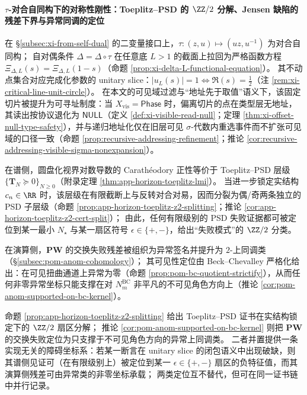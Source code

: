 \paragraph{\texorpdfstring{$\tau$}{tau}-对合自同构下的对称性刚性：Toeplitz--PSD 的 \texorpdfstring{$\ZZ/2$}{Z/2} 分解、Jensen 缺陷的残差下界与异常同调的定位}
在 \S\ref{subsec:xi-from-self-dual} 的二变量接口上，\(\tau:(z,u)\mapsto(uz,u^{-1})\) 为对合自同构；
自对偶条件 \(\Delta=\Delta\circ\tau\) 在任意底 \(L>1\) 的截面上拉回为严格函数方程 \(\Xi_{\Delta,L}(s)=\Xi_{\Delta,L}(1-s)\)（命题 \ref{prop:xi-delta-L-functional-equation}）。
其不动点集合对应完成化参数的 unitary slice：\(|u_L(s)|=1\iff \Re(s)=\tfrac12\)（注 \ref{rem:xi-critical-line-unit-circle}）。
在本文的可见域过滤与“地址先于取值”语义下，该固定切片被提升为可寻址制度：当 \(X_{\mathrm{vis}}=\mathsf{Phase}\) 时，偏离切片的点在类型层无地址，其读出按协议退化为 \(\mathsf{NULL}\)（定义 \ref{def:xi-visible-read-null}；定理 \ref{thm:xi-offset-null-type-safety}），并与递归地址化仅在旧层可见 \(\sigma\)-代数内重选事件而不扩张可见域的口径一致（命题 \ref{prop:recursive-addressing-refinement}；推论 \ref{cor:recursive-addressing-visible-sigma-nonexpansion}）。
\par
在谱侧，圆盘化视界对数导数的 Carath\'eodory 正性等价于 Toeplitz--PSD 层级 \(\{\mathbf{T}_N\succeq 0\}_{N\ge 0}\)（附录定理 \ref{thm:app-horizon-toeplitz-lmi}）。
当进一步锁定实结构 \(c_n\in\RR\) 时，该层级在有限截断上与反转对合对易，因而分裂为偶/奇两条独立的 PSD 子层级（命题 \ref{prop:app-horizon-toeplitz-z2-splitting}；推论 \ref{cor:app-horizon-toeplitz-z2-cert-split}）；
由此，任何有限级别的 PSD 失败证据都可被定位到某一最小 \(N_\star\) 与某一扇区符号 \(\epsilon\in\{+,-\}\)，给出“失败模式”的 \(\ZZ/2\) 分类。
\par
在演算侧，\(\mathbf{PW}\) 的交换失败残差被组织为异常签名并提升为 \(2\)-上同调类（\S\ref{subsec:pom-anom-cohomology}）；
其可见性定位由 Beck--Chevalley 严格化给出：在可见扭曲通道上异常为零（命题 \ref{prop:pom-bc-quotient-strictify}），从而任何非零异常坐标只能支撑在对 \(N^{\mathrm{BC}}_m\) 非平凡的不可见角色方向上（推论 \ref{cor:pom-anom-supported-on-bc-kernel}）。
\begin{remark}\label{rem:xi-toeplitz-z2-anom-alignment}
命题 \ref{prop:app-horizon-toeplitz-z2-splitting} 给出 Toeplitz--PSD 证书在实结构锁定下的 \(\ZZ/2\) 扇区分解；
推论 \ref{cor:pom-anom-supported-on-bc-kernel} 则把 \(\mathbf{PW}\) 的交换失败定位为只支撑于不可见角色方向的异常上同调类。
二者并置提供一条实现无关的障碍坐标系：若某一断言在 unitary slice 的闭包语义中出现破缺，则其谱侧见证可（在有限级别上）被定位到某一 \(\epsilon\in\{+,-\}\) 扇区的负特征值，而其演算侧残差可由异常类的非零坐标承载；
两类定位互不替代，但可在同一证书链中并行记录。
\end{remark}
